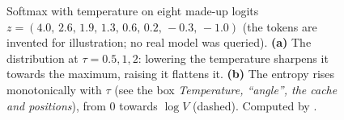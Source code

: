 \begin{figure}[tb]
\caption{Softmax with temperature on eight made-up logits $z=(4.0,\,2.6,\,1.9,\,1.3,\,0.6,\,0.2,\,-0.3,\,-1.0)$ (the tokens are invented for illustration; no real model was queried). \textbf{(a)} The distribution at $\tau=0.5,1,2$: lowering the temperature sharpens it towards the maximum, raising it flattens it. \textbf{(b)} The entropy rises monotonically with $\tau$ (see the box \emph{Temperature, ``angle'', the cache and positions}), from $0$ towards $\log V$ (dashed). Computed by .}
\label{fig:L6-temp}
\end{figure}



